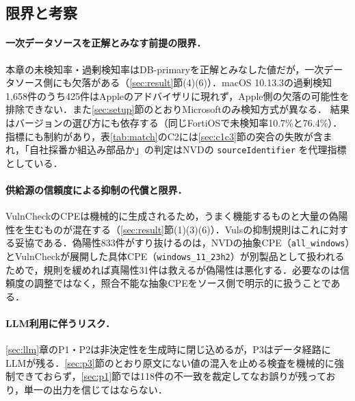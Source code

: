 \subsection{限界と考察}
\label{sec:limit}

\paragraph{一次データソースを正解とみなす前提の限界．}
本章の未検知率・過剰検知率はDB-primaryを正解とみなした値だが，一次データソース側にも欠落がある（\ref{sec:result}節(4)(6)）．macOS 10.13.3の過剰検知1,658件のうち425件はAppleのアドバイザリに現れず，Apple側の欠落の可能性を排除できない．また\ref{sec:setup}節のとおりMicrosoftのみ検知方式が異なる．
結果はバージョンの選び方にも依存する（同じFortiOSで未検知率10.7\%と76.4\%）．
指標にも制約があり，表\ref{tab:match}のC2には\ref{sec:c1c3}節の突合の失敗が含まれ，「自社採番か組込み部品か」の判定はNVDの \texttt{sourceIdentifier} を代理指標としている．

\paragraph{供給源の信頼度による抑制の代償と限界．}
VulnCheckのCPEは機械的に生成されるため，うまく機能するものと大量の偽陽性を生むものが混在する（\ref{sec:result}節(1)(3)(6)）．Vulsの抑制規則はこれに対する妥協である．偽陽性833件がすり抜けるのは，NVDの抽象CPE（\texttt{all\_windows}）とVulnCheckが展開した具体CPE（\texttt{windows\_11\_23h2}）が別製品として扱われるためで，規則を緩めれば真陽性31件は救えるが偽陽性は悪化する．必要なのは信頼度の調整ではなく，照合不能な抽象CPEをソース側で明示的に扱うことである．

\paragraph{LLM利用に伴うリスク．}
\ref{sec:llm}章のP1・P2は非決定性を生成時に閉じ込めるが，P3はデータ経路にLLMが残る．\ref{sec:p3}節のとおり原文にない値の混入を止める検査を機械的に強制できておらず，\ref{sec:p1}節では118件の不一致を裁定してなお誤りが残っており，単一の出力を信じてはならない．
